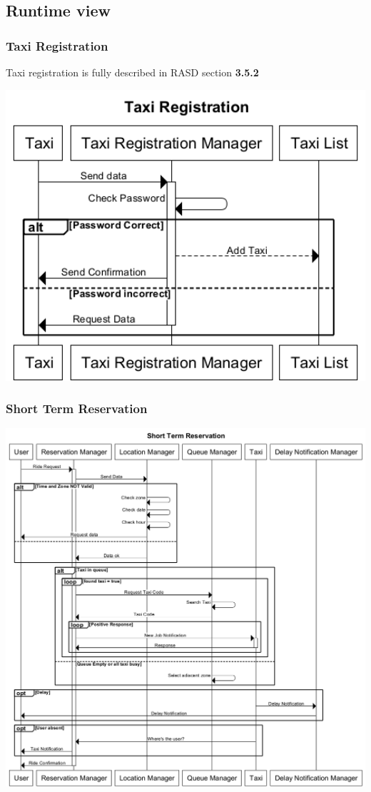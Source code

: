 \subsection{Runtime view}
	\subsubsection{Taxi Registration}
		Taxi registration is fully described in RASD section \textbf{3.5.2}
		\begin{center}
			\includegraphics[width=1\textwidth]{./images/Taxi_Registration.png}
		\end{center}
	\subsubsection{Short Term Reservation}
		\begin{center}
			\includegraphics[width=1\textwidth]{./images/Short_Term_Reservation_Complete.png}
		\end{center}
